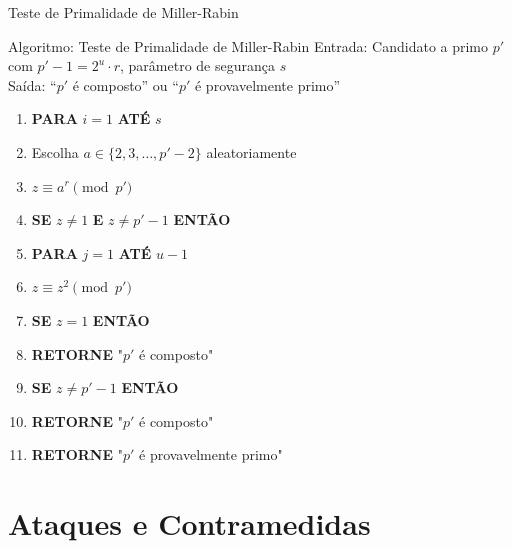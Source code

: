 \documentclass{beamer}
\begin{document}
\begin{frame}{Teste de Primalidade de Miller-Rabin}

\begin{block}{Algoritmo: Teste de Primalidade de Miller-Rabin}
    Entrada: Candidato a primo $p'$ com $p'-1 = 2^u \cdot r$, parâmetro de segurança $s$ \\
    Saída: ``$p'$ é composto'' ou ``$p'$ é provavelmente primo''
    
    \vspace{0.2cm} 
    
    \begin{enumerate}[1.]
    \tiny
        \item \textbf{PARA} $i=1$ \textbf{ATÉ} $s$
        \item \hspace{0.5cm} Escolha $a \in \{2, 3, \dots, p'-2\}$ aleatoriamente
        \item \hspace{0.5cm} $z \equiv a^r \pmod{p'}$
        \item \hspace{0.5cm} \textbf{SE} $z \neq 1$ \textbf{E} $z \neq p'-1$ \textbf{ENTÃO}
        \item \hspace{1.0cm} \textbf{PARA} $j=1$ \textbf{ATÉ} $u-1$
        \item \hspace{1.5cm} $z \equiv z^2 \pmod{p'}$
        \item \hspace{1.5cm} \textbf{SE} $z=1$ \textbf{ENTÃO}
        \item \hspace{2.0cm} \textbf{RETORNE} "$p'$ é composto"
        \item \hspace{1.0cm} \textbf{SE} $z \neq p'-1$ \textbf{ENTÃO}
        \item \hspace{1.5cm} \textbf{RETORNE} "$p'$ é composto"
        \item \textbf{RETORNE} "$p'$ é provavelmente primo"
    \end{enumerate}
\end{block}

\end{frame}

\section{Ataques e Contramedidas}
\end{document}
